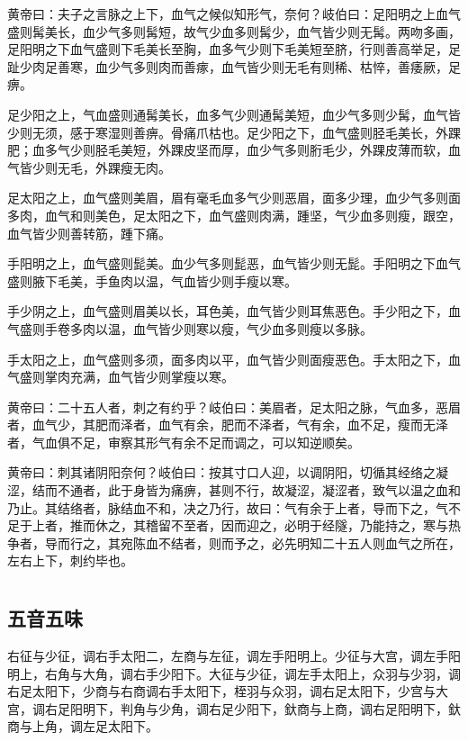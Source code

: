 \documentclass[12pt,UTF8]{ctexbook}
\begin{document}
	黄帝曰：夫子之言脉之上下，血气之候似知形气，奈何？岐伯曰：足阳明之上血气盛则髯美长，血少气多则髯短，故气少血多则髯少，血气皆少则无髯。两吻多画，足阳明之下血气盛则下毛美长至胸，血多气少则下毛美短至脐，行则善高举足，足趾少肉足善寒，血少气多则肉而善瘃，血气皆少则无毛有则稀、枯悴，善痿厥，足痹。
	
	足少阳之上，气血盛则通髯美长，血多气少则通髯美短，血少气多则少髯，血气皆少则无须，感于寒湿则善痹。骨痛爪枯也。足少阳之下，血气盛则胫毛美长，外踝肥；血多气少则胫毛美短，外踝皮坚而厚，血少气多则胻毛少，外踝皮薄而软，血气皆少则无毛，外踝瘦无肉。
	
	足太阳之上，血气盛则美眉，眉有毫毛血多气少则恶眉，面多少理，血少气多则面多肉，血气和则美色，足太阳之下，血气盛则肉满，踵坚，气少血多则瘦，跟空，血气皆少则善转筋，踵下痛。
	
	手阳明之上，血气盛则髭美。血少气多则髭恶，血气皆少则无髭。手阳明之下血气盛则腋下毛美，手鱼肉以温，气血皆少则手瘦以寒。
	
	手少阴之上，血气盛则眉美以长，耳色美，血气皆少则耳焦恶色。手少阳之下，血气盛则手卷多肉以温，血气皆少则寒以瘦，气少血多则瘦以多脉。
	
	手太阳之上，血气盛则多须，面多肉以平，血气皆少则面瘦恶色。手太阳之下，血气盛则掌肉充满，血气皆少则掌瘦以寒。
	
	黄帝曰：二十五人者，刺之有约乎？岐伯曰：美眉者，足太阳之脉，气血多，恶眉者，血气少，其肥而泽者，血气有余，肥而不泽者，气有余，血不足，瘦而无泽者，气血俱不足，审察其形气有余不足而调之，可以知逆顺矣。
	
	黄帝曰：刺其诸阴阳奈何？岐伯曰：按其寸口人迎，以调阴阳，切循其经络之凝涩，结而不通者，此于身皆为痛痹，甚则不行，故凝涩，凝涩者，致气以温之血和乃止。其结络者，脉结血不和，决之乃行，故曰：气有余于上者，导而下之，气不足于上者，推而休之，其稽留不至者，因而迎之，必明于经隧，乃能持之，寒与热争者，导而行之，其宛陈血不结者，则而予之，必先明知二十五人则血气之所在，左右上下，刺约毕也。
	
	\part{}
	\chapter{五音五味}
	
	右征与少征，调右手太阳二，左商与左征，调左手阳明上。少征与大宫，调左手阳明上，右角与大角，调右手少阳下。大征与少征，调左手太阳上，众羽与少羽，调右足太阳下，少商与右商调右手太阳下，桎羽与众羽，调右足太阳下，少宫与大宫，调右足阳明下，判角与少角，调右足少阳下，釱商与上商，调右足阳明下，釱商与上角，调左足太阳下。
	
\end{document}
